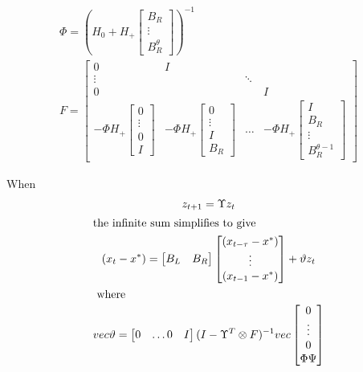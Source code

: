 \documentclass{article}
\begin{document}
{\begin{gather*}
  \Phi= (H_0 + H_+  \begin{bmatrix}
    B_R\\\vdots\\B^\theta_R
  \end{bmatrix})^{-1}\\
F=
\begin{bmatrix}
0&I\\
\vdots&&\ddots\\
0&&&I\\
-\Phi H_+\begin{bmatrix}
0\\ \vdots \\ 0\\I
  \end{bmatrix}&
-\Phi H_+\begin{bmatrix}
0\\ \vdots\\I\\B_R
  \end{bmatrix}&\ldots&
-\Phi H_+\begin{bmatrix}
I\\B_R\\\vdots\\B^{\theta-1}_R
  \end{bmatrix}
\end{bmatrix}
\end{gather*}

When 
\begin{gather*}
  z_{t+1} = \Upsilon z_t\\ \intertext{the infinite sum simplifies to give}
(x_{t}-x^\ast) = \begin{bmatrix}
B_L& B_R  
\end{bmatrix}
 \begin{bmatrix}
    (x_{t-\tau}-x^\ast)\\\vdots\\(x_{t-1}-x^\ast)
  \end{bmatrix} + \vartheta z_t
\\
\intertext{ where }
vec\vartheta =   \begin{bmatrix}
  0&\dots 0&I
  \end{bmatrix}
(I - \Upsilon^T\otimes F)^{-1} vec
\begin{bmatrix}
0\\ \vdots \\ 0 \\
\Phi\Psi
\end{bmatrix}
\end{gather*}


}
\end{document}
